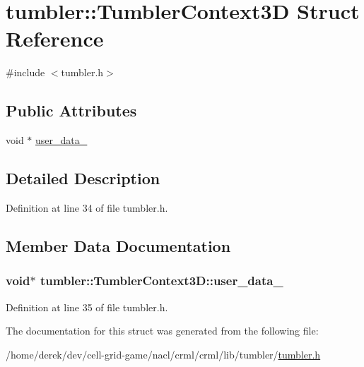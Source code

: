 \hypertarget{structtumbler_1_1_tumbler_context3_d}{
\section{tumbler::TumblerContext3D Struct Reference}
\label{structtumbler_1_1_tumbler_context3_d}
}


{\ttfamily \#include $<$tumbler.h$>$}

\subsection*{Public Attributes}
\begin{DoxyCompactItemize}
\item 
void $\ast$ \hyperlink{structtumbler_1_1_tumbler_context3_d_a1274a5b24b002c4e264bc7ee9298e85d}{user\_\-data\_\-}
\end{DoxyCompactItemize}


\subsection{Detailed Description}


Definition at line 34 of file tumbler.h.



\subsection{Member Data Documentation}
\hypertarget{structtumbler_1_1_tumbler_context3_d_a1274a5b24b002c4e264bc7ee9298e85d}{
\subsubsection[{user\_\-data\_\-}]{\setlength{\rightskip}{0pt plus 5cm}void$\ast$ {\bf tumbler::TumblerContext3D::user\_\-data\_\-}}}
\label{structtumbler_1_1_tumbler_context3_d_a1274a5b24b002c4e264bc7ee9298e85d}


Definition at line 35 of file tumbler.h.



The documentation for this struct was generated from the following file:\begin{DoxyCompactItemize}
\item 
/home/derek/dev/cell-\/grid-\/game/nacl/crml/crml/lib/tumbler/\hyperlink{tumbler_8h}{tumbler.h}\end{DoxyCompactItemize}
